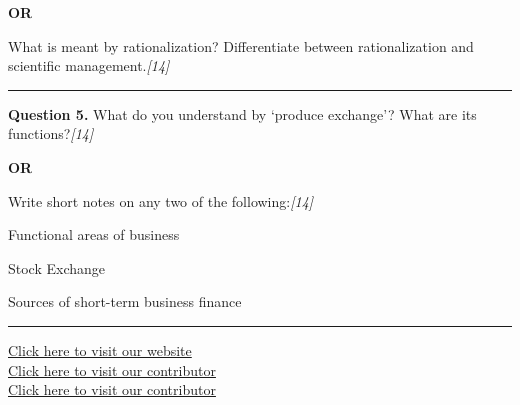 \documentclass[11pt,a4paper]{article}
\newcommand{\pts}[1]{\hfill   \textit{[#1]}}
\begin{document}
\centerline{   \textbf{OR}}

What is meant by rationalization? Differentiate between rationalization and scientific management.\pts{14}

\medskip\rule{\linewidth}{0.2pt}




\noindent   \textbf{Question 5.}
What do you understand by `produce exchange'? What are its functions?\pts{14}

\centerline{   \textbf{OR}}

Write short notes on any two of the following:\pts{14}

\begin{parts}
  \item Functional areas of business
  \item Stock Exchange
  \item Sources of short-term business finance
\end{parts}

\vfill
\rule{\linewidth}{0.4pt}

\begin{center}\small
\href{https://bhu-exam.vercel.app/}{Click here to visit our website}\\[4pt]
\href{https://me-aryan.vercel.app/}{Click here to visit our contributor}\\[4pt]
\href{https://quashan-me.vercel.app/}{Click here to visit our contributor}
\end{center}
\end{document}
